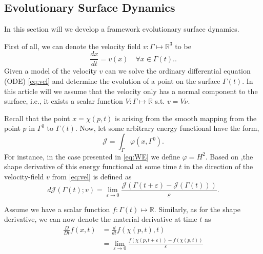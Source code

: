 \subsection{Evolutionary Surface Dynamics}%
\label{sub:evolutionary_equations}

In this section will we develop a framework evolutionary surface dynamics.

First of all, we can denote the velocity field $v: \Gamma \mapsto \mathbb{R} ^3$ to be
\begin{equation}
    \label{eq:vel}
\frac{dx }{ d t}  = v\left( x \right) \quad \forall x \in \Gamma \left( t \right) .
.\end{equation}
Given a model of the velocity $v$ can we solve the ordinary differential equation (ODE) \eqref{eq:vel} and determine the evolution of a point on the surface $\Gamma\left( t \right)  $. In this article will we assume that the velocity only has a
normal component to the surface, i.e., it exists a scalar function $V: \Gamma \mapsto \mathbb{R} $ s.t. $v = V \nu  $.

Recall that the point $x = \chi \left( p,t \right)  $ is arising from the smooth mapping from the point $p $ in  $\Gamma ^{0} $ to $\Gamma \left( t \right) $. Now, let some arbitrary energy functional have the form,
\[
\mathcal{J} = \int_{\Gamma }^{} \varphi \left( x, \Gamma^{0}  \right) .
\]
For instance, in the case presented in \eqref{eq:WE} we define $\varphi = H ^2$. Based on \cite{dougan2012first},the shape derivative of this energy functional at some time $t$ in the direction of the velocity-field $v$ from \eqref{eq:vel} is defined as \[
d \mathcal{J} \left( \Gamma \left( t \right) ; v  \right) = \lim_{\varepsilon  \to 0} \frac{\mathcal{J} \left( \Gamma \left( t + \varepsilon  \right) - \mathcal{J}\left( \Gamma \left( t  \right) \right)      \right)}{\varepsilon }.
\]

Assume we have a scalar function $f: \Gamma\left( t \right)  \mapsto \mathbb{R}  $. Similarly, as for the shape derivative, we can now denote the material derivative at time $t$ as
\[
    \begin{split}
\frac{D}{Dt}  f\left( x,t \right)  & = \frac{d}{dt} f \left( \chi \left( p,t \right) , t \right) \\
&= \lim_{\varepsilon \to 0}  \frac{f \left( \chi \left( p, t + \varepsilon  \right)  \right) - f \left( \chi \left( p, t  \right)  \right) }{ \varepsilon }
    \end{split}
\]




